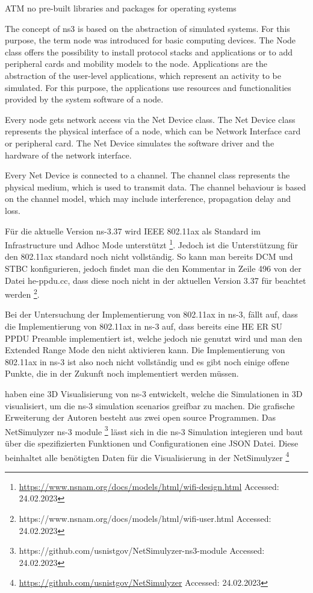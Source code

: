 \documentclass[]{nsm-thesis}
\begin{document}
ATM no pre-built libraries and packages for operating systems
 
The concept of ns3 is based on the abstraction of simulated systems.
For this purpose, the term node was introduced for basic computing devices. The Node class offers the possibility to
install protocol stacks and applications or to add peripheral cards and mobility models to the node.
Applications are the abstraction of the user-level applications, which represent an activity to be simulated.
For this purpose, the applications use resources and functionalities provided by the system software of a node.

Every node gets network access via the Net Device class. The Net Device class represents the physical interface of a node,
which can be Network Interface card or peripheral card. The Net Device simulates the software driver and the hardware of the network interface.

Every Net Device is connected to a channel. The channel class represents the physical medium, which is used to transmit data. The channel behaviour is based
on the channel model, which may include interference, propagation delay and loss.

Für die aktuelle Version ns-3.37 wird IEEE 802.11ax als Standard im Infrastructure und Adhoc Mode unterstützt \footnote{\url{https://www.nsnam.org/docs/models/html/wifi-design.html} Accessed: 24.02.2023}.
Jedoch ist die Unterstützung für den 802.11ax standard noch nicht vollständig. So kann man bereits DCM und STBC konfigurieren, jedoch findet man die den Kommentar in Zeile 496 von der Datei he-ppdu.cc, dass diese noch nicht in der aktuellen Version 3.37 für beachtet werden \footnote{https://www.nsnam.org/docs/models/html/wifi-user.html Accessed: 24.02.2023}.

Bei der Untersuchung der Implementierung von 802.11ax in ns-3, fällt auf, dass die Implementierung von 802.11ax in ns-3 auf, dass bereits eine HE ER SU \ac{PPDU} Preamble implementiert ist, welche jedoch nie genutzt wird und man den Extended Range Mode
den nicht aktivieren kann. Die Implementierung von 802.11ax in ns-3 ist also noch nicht vollständig und es gibt noch einige offene Punkte, die in der Zukunft noch implementiert werden müssen.

\textcite{black_netsimulyzer_2021} haben eine 3D Visualisierung von ns-3 entwickelt, welche die Simulationen in 3D visualisiert, um die ns-3 simulation
scenarios greifbar zu machen. Die grafische Erweiterung der Autoren besteht aus zwei open source Programmen. Das 
NetSimulyzer ns-3 module \footnote{https://github.com/usnistgov/NetSimulyzer-ns3-module Accessed: 24.02.2023} lässt sich in die ns-3 Simulation integieren und baut über die spezifizierten Funktionen und Configurationen
eine JSON Datei. Diese beinhaltet alle benötigten Daten für die Visualisierung in der NetSimulyzer \footnote{\url{https://github.com/usnistgov/NetSimulyzer} Accessed: 24.02.2023}
\end{document}

